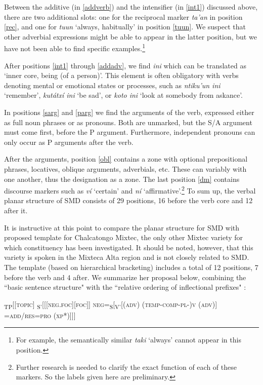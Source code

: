 \documentclass[output=paper]{langscibook}
\begin{document}
Between the additive (in \ref{addverb}) and the intensifier (in \ref{int1}) discussed above, there are two additional slots: one for the reciprocal marker \textit{ta'an} in position \ref{rec}, and one for \textit{tuun} `always, habitually' in position \ref{tuun}. We suspect that other adverbial expressions might be able to appear in the latter position, but we have not been able to find specific examples.\footnote{For example, the semantically similar \textit{taki} `always' cannot appear in this position.}

After positions \ref{int1} through \ref{addadv}, we find \textit{ini} which can be translated as `inner core, being (of a person)'. This element is often obligatory with verbs denoting mental or emotional states or processes, such as \textit{ntiku'un ini} `remember', \textit{kutátxí ini} `be sad', or \textit{koto ini} `look at somebody from askance'. 

In positions \ref{sarg} and \ref{parg} we find the arguments of the verb, expressed either as full noun phrases or as pronouns. Both are unmarked, but the S/A argument must come first, before the P argument. 
Furthermore, independent pronouns can only occur as P arguments after the verb. 

After the arguments, position \ref{obl} contains a zone with optional prepositional phrases, locatives, oblique arguments, adverbials, etc. These can variably with one another, thus the designation as a zone. 
The last position \ref{dm} contains discourse markers such as \textit{ví} `certain' and \textit{ní} `affirmative'.\footnote{Further research is needed to clarify the exact function of each of these markers. So the labels given here are preliminary.}
To sum up, the verbal planar structure of SMD consists of 29 positions, 16 before the verb core and 12 after it.


It is instructive at this point to compare the planar structure for SMD with \citet{macaulay1996grammar} proposed template for Chalcatongo Mixtec, the only other Mixtec variety for which constituency has been investigated. It should be noted, however, that this variety is spoken in the Mixteca Alta region and is not closely related to SMD.
The template (based on hierarchical bracketing) includes a total of 12 positions, 7 before the verb and 4 after. We summarize her proposal below, combining the ``basic sentence structure" with the ``relative ordering of inflectional prefixes" \citep[79, 146]{macaulay1996grammar}:

\ea
    \textsubscript{TP}[[\textsc{topic}] \textsubscript{S'}[[[\textsc{neg.foc}][\textsc{foc}]] \textsc{neg}=\textsubscript{S}[\textsubscript{V'}[(\textsc{adv}) (\textsc{temp-comp-pl-})\textsc{v} (\textsc{adv})] \\=\textsc{add/res}=\textsc{pro} (\textsc{xp*})]]]
\z
\end{document}

